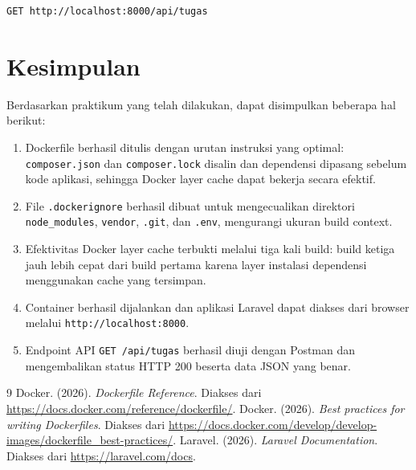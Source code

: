 \documentclass[a4paper,oneside,11pt]{book}
\begin{document}
\begin{lstlisting}[caption={Endpoint yang diuji dengan Postman}]
GET http://localhost:8000/api/tugas
\end{lstlisting}


\chapter{Kesimpulan}

Berdasarkan praktikum yang telah dilakukan, dapat disimpulkan beberapa hal berikut:
\begin{enumerate}
    \item Dockerfile berhasil ditulis dengan urutan instruksi yang optimal: \texttt{composer.json} dan \texttt{composer.lock} disalin dan dependensi dipasang sebelum kode aplikasi, sehingga Docker layer cache dapat bekerja secara efektif.
    \item File \texttt{.dockerignore} berhasil dibuat untuk mengecualikan direktori \texttt{node\_modules}, \texttt{vendor}, \texttt{.git}, dan \texttt{.env}, mengurangi ukuran build context.
    \item Efektivitas Docker layer cache terbukti melalui tiga kali build: build ketiga jauh lebih cepat dari build pertama karena layer instalasi dependensi menggunakan cache yang tersimpan.
    \item Container berhasil dijalankan dan aplikasi Laravel dapat diakses dari browser melalui \texttt{http://localhost:8000}.
    \item Endpoint API \texttt{GET /api/tugas} berhasil diuji dengan Postman dan mengembalikan status HTTP 200 beserta data JSON yang benar.
\end{enumerate}

\clearpage

\begin{thebibliography}{9}
Docker. (2026). \textit{Dockerfile Reference}. Diakses dari \url{https://docs.docker.com/reference/dockerfile/}.
Docker. (2026). \textit{Best practices for writing Dockerfiles}. Diakses dari \url{https://docs.docker.com/develop/develop-images/dockerfile_best-practices/}.
Laravel. (2026). \textit{Laravel Documentation}. Diakses dari \url{https://laravel.com/docs}.
\end{thebibliography}
\end{document}
